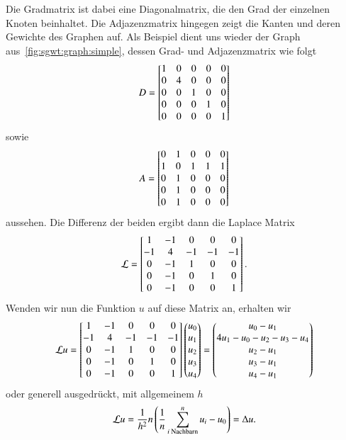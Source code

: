 Die Gradmatrix \degreeM{} ist dabei eine Diagonalmatrix, die den Grad der 
einzelnen Knoten beinhaltet. Die Adjazenzmatrix hingegen zeigt die Kanten und 
deren Gewichte des Graphen auf. Als Beispiel dient uns 
wieder der Graph aus~\cref{fig:sgwt:graph:simple}, dessen Grad- und 
Adjazenzmatrix wie folgt
\begin{equation*}
\degreeM =
\begin{bmatrix}
1 & 0 & 0 & 0 & 0 \\
0 & 4 & 0 & 0 & 0 \\
0 & 0 & 1 & 0 & 0 \\
0 & 0 & 0 & 1 & 0 \\
0 & 0 & 0 & 0 & 1
\end{bmatrix}
\end{equation*}
sowie
\begin{equation*}
\adjacencyM =
\begin{bmatrix}
0 & 1 & 0 & 0 & 0 \\
1 & 0 & 1 & 1 & 1 \\
0 & 1 & 0 & 0 & 0 \\
0 & 1 & 0 & 0 & 0 \\
0 & 1 & 0 & 0 & 0
\end{bmatrix}
\end{equation*}
aussehen. Die Differenz der beiden ergibt dann die Laplace Matrix
\begin{equation*}
\laplaceL =
\begin{bmatrix}
1 & -1 & 0 & 0 & 0 \\
-1 & 4 & -1 & -1 & -1 \\
0 & -1 & 1 & 0 & 0 \\
0 & -1 & 0 & 1 & 0 \\
0 & -1 & 0 & 0 & 1
\end{bmatrix}.
\end{equation*}
Wenden wir nun die Funktion $u$ auf diese Matrix an, erhalten wir
\begin{equation*}
\laplaceL u =
\begin{bmatrix}
1 & -1 & 0 & 0 & 0 \\
-1 & 4 & -1 & -1 & -1 \\
0 & -1 & 1 & 0 & 0 \\
0 & -1 & 0 & 1 & 0 \\
0 & -1 & 0 & 0 & 1
\end{bmatrix}
\begin{pmatrix}
u_0 \\
u_1 \\
u_2 \\
u_3 \\
u_4
\end{pmatrix}
=
\begin{pmatrix}
u_0 - u_1 \\
4 u_1 - u_0 - u_2 - u_3 - u_4 \\
u_2 - u_1 \\
u_3 - u_1 \\
u_4 - u_1
\end{pmatrix}
\end{equation*}
oder generell ausgedr\"uckt, mit allgemeinem $h$
\begin{equation*}
\laplaceL u = \frac{1}{h^2}n\left(\frac{1}{n}\sum_{i\text{ Nachbarn}}^{n}u_i - 
u_0\right) = \Delta u.
\end{equation*}
